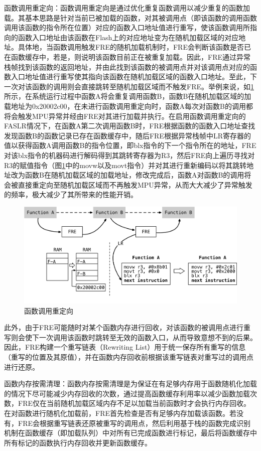 \documentclass[UTF8,12pt,a4paper,twoside]{ctexart}
\numberwithin{figure}{section}
\begin{document}
\par 函数调用重定向：函数调用重定向是通过优化重复函数调用以减少重复的函数加载。其基本思路是针对当前已被加载的函数，对其被调用点（即该函数的调用函数调用该函数的指令所在位置）对应的函数入口地址值进行重写，使该函数调用所指向的函数入口地址由该函数在Flash上的对应地址变为在随机加载区域的对应地址。具体地，当函数调用触发FRE的随机加载机制时，FRE会判断该函数是否已在函数缓存中，若是，则说明该函数目前正在被重复加载。因此，FRE通过异常栈帧找到该函数的返回地址，并由此找到该函数的被调用点并对该调用点对应的函数入口地址值进行重写使其指向该函数在随机加载区域的函数入口地址。至此，下一次对该函数的调用则会直接跳转至随机加载区域而不触发FRE。举例来说，如\ref{fig:redirection}所示，在系统运行过程中函数A将会重复调用函数B，函数B在随机加载区域的加载地址为0x20002c00，在未进行函数调用重定向时，函数A每次对函数B的调用都将会触发MPU异常并经由FRE对其进行加载并执行。在启用函数调用重定向的FASLR情况下，在函数A第二次调用函数B时，FRE根据函数的函数入口地址查找发现函数B的函数记录已存在函数缓存中，随后FRE根据异常栈帧中LR寄存器的值以获得函数A调用函数B的指令位置，即blx指令的下一个指令所在的地址，FRE对该blx指令的机器码进行解码得到其跳转寄存器为R3，然后FRE向上遍历寻找对R3的赋值指令（图\ref{fig:redirection}中的movw以及movt指令）并对其进行重新编码以将其跳转地址改为函数B在随机加载区域的加载地址，修改完成后，函数A对函数B的调用将会被直接重定向至随机加载区域而不再触发MPU异常，从而大大减少了异常触发的频率，极大减少了其所带来的性能开销。
\begin{figure}[H]
    \centering
    \includegraphics[scale=0.5]{graph/redirection.png}
    \caption{函数调用重定向}
    \label{fig:redirection}
\end{figure}
\par 此外，由于FRE可能随时对某个函数内存进行回收，对该函数的被调用点进行重写则会使下一次调用该函数时跳转至无效的函数入口，从而导致意想不到的后果。因此，FRE构建一个重写链表（Rewriting List）用于统一保存所有重写的信息（重写的位置及其原值），并在函数内存回收前根据该重写链表对重写过的调用点进行还原。
\par 函数内存按需清理：函数内存按需清理是为保证在有足够内存用于函数随机化加载的情况下尽可能减少内存回收的次数，通过提高函数缓存利用率以减少函数加载次数，FRE仅在当前随机加载区域内存不足以加载当前函数时才会执行内存回收。在对函数进行随机化加载前，FRE首先检查是否有足够内存加载该函数。若没有，FRE会根据重写链表还原被重写的调用点，然后利用基于栈的函数完成识别机制在函数缓存（即加载队列）中对所有已完成函数进行标记，最后将函数缓存中所有标记的函数执行内存回收并更新函数缓存。
\end{document}
